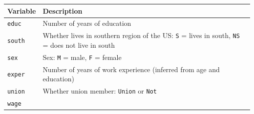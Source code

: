 \documentclass[
]{report}
\begin{document}
\begin{longtable}[]{@{}ll@{}}
\toprule
\begin{minipage}[b]{0.11\columnwidth}\raggedright
\textbf{Variable}\strut
\end{minipage} & \begin{minipage}[b]{0.83\columnwidth}\raggedright
\textbf{Description}\strut
\end{minipage}\tabularnewline
\midrule
\endhead
\begin{minipage}[t]{0.11\columnwidth}\raggedright
\texttt{educ}\strut
\end{minipage} & \begin{minipage}[t]{0.83\columnwidth}\raggedright
Number of years of education\strut
\end{minipage}\tabularnewline
\begin{minipage}[t]{0.11\columnwidth}\raggedright
\texttt{south}\strut
\end{minipage} & \begin{minipage}[t]{0.83\columnwidth}\raggedright
Whether lives in southern region of the US: \texttt{S} = lives in south, \texttt{NS} = does not live in south\strut
\end{minipage}\tabularnewline
\begin{minipage}[t]{0.11\columnwidth}\raggedright
\texttt{sex}\strut
\end{minipage} & \begin{minipage}[t]{0.83\columnwidth}\raggedright
Sex: \texttt{M} = male, \texttt{F} = female\strut
\end{minipage}\tabularnewline
\begin{minipage}[t]{0.11\columnwidth}\raggedright
\texttt{exper}\strut
\end{minipage} & \begin{minipage}[t]{0.83\columnwidth}\raggedright
Number of years of work experience (inferred from age and education)\strut
\end{minipage}\tabularnewline
\begin{minipage}[t]{0.11\columnwidth}\raggedright
\texttt{union}\strut
\end{minipage} & \begin{minipage}[t]{0.83\columnwidth}\raggedright
Whether union member: \texttt{Union} or \texttt{Not}\strut
\end{minipage}\tabularnewline
\begin{minipage}[t]{0.11\columnwidth}\raggedright
\texttt{wage}\strut
\end{minipage} & \begin{minipage}[t]{0.83\columnwidth}\raggedright

\end{minipage}
\end{longtable}
\end{document}
